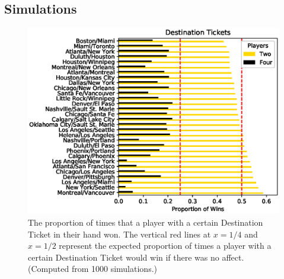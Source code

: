 \subsection{Simulations}

\begin{figure}[!ht]
\centering
\includegraphics[scale=.8]{figures/destination_tickets}
\caption{The proportion of times that a player with a certain
Destination Ticket in their hand won.
The vertical red lines at $x=1/4$ and $x=1/2$ represent
the expected proportion of times a player with a certain Destination Ticket
would win if there was no affect. (Computed from 1000 simulations.)}
\label{fig:tickets}
\end{figure}


%
